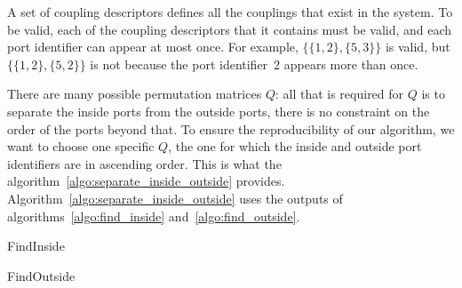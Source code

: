 A set of coupling descriptors defines all the couplings that exist in the system.
To be valid, each of the coupling descriptors that it contains must be valid, and each port identifier can appear at most once.
For example,
$\lbrace \lbrace 1, 2 \rbrace, \lbrace 5, 3 \rbrace \rbrace$
is valid, but 
$\lbrace \lbrace 1, 2 \rbrace, \lbrace 5, 2 \rbrace \rbrace$
is not because the port identifier~2 appears more than once.

There are many possible permutation matrices $Q$: all that is required for $Q$ is to separate the inside ports from the outside ports, there is no constraint on the order of the ports beyond that.
To ensure the reproducibility of our algorithm, we want to choose one specific $Q$, the one for which the inside and outside port identifiers are in ascending order.
This is what the algorithm~\ref{algo:separate_inside_outside} provides.
Algorithm~\ref{algo:separate_inside_outside} uses the outputs of algorithms~\ref{algo:find_inside} and~\ref{algo:find_outside}.

\begin{algorithm}
    \caption{FindInside}
    \label{algo:find_inside}
    \begin{algorithmic}
         
        \ENDFOR
         
    \end{algorithmic}
\end{algorithm}

\begin{algorithm}
    \caption{FindOutside}
    \label{algo:find_outside}
    \begin{algorithmic}
         
         
         
    \end{algorithmic}
\end{algorithm}

